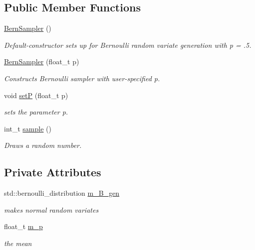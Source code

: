 \subsection*{Public Member Functions}
\begin{DoxyCompactItemize}
\item 
\mbox{\label{classrvsamp_1_1BernSampler_a85b39f1940da6d56a0d7923f684bdb5f}} 
\hyperlink{classrvsamp_1_1BernSampler_a85b39f1940da6d56a0d7923f684bdb5f}{Bern\+Sampler} ()
\begin{DoxyCompactList}\small\item\em Default-\/constructor sets up for Bernoulli random variate generation with p = .5. \end{DoxyCompactList}\item 
\hyperlink{classrvsamp_1_1BernSampler_a2cc92da7edf3b4348e01e7a1cab59fe2}{Bern\+Sampler} (float\+\_\+t p)
\begin{DoxyCompactList}\small\item\em Constructs Bernoulli sampler with user-\/specified p. \end{DoxyCompactList}\item 
void \hyperlink{classrvsamp_1_1BernSampler_a1cd648e7141ee9b3a50f67256601a140}{setP} (float\+\_\+t p)
\begin{DoxyCompactList}\small\item\em sets the parameter p. \end{DoxyCompactList}\item 
int\+\_\+t \hyperlink{classrvsamp_1_1BernSampler_a2520daff5a896b58073d6756758d1323}{sample} ()
\begin{DoxyCompactList}\small\item\em Draws a random number. \end{DoxyCompactList}\end{DoxyCompactItemize}
\subsection*{Private Attributes}
\begin{DoxyCompactItemize}
\item 
\mbox{\label{classrvsamp_1_1BernSampler_ada54494593944ed1aa4ecdafe3047e93}} 
std\+::bernoulli\+\_\+distribution \hyperlink{classrvsamp_1_1BernSampler_ada54494593944ed1aa4ecdafe3047e93}{m\+\_\+\+B\+\_\+gen}
\begin{DoxyCompactList}\small\item\em makes normal random variates \end{DoxyCompactList}\item 
\mbox{\label{classrvsamp_1_1BernSampler_ae0b9d07a5c37311c21c90b5d0d09ac56}} 
float\+\_\+t \hyperlink{classrvsamp_1_1BernSampler_ae0b9d07a5c37311c21c90b5d0d09ac56}{m\+\_\+p}
\begin{DoxyCompactList}\small\item\em the mean \end{DoxyCompactList}\end{DoxyCompactItemize}
